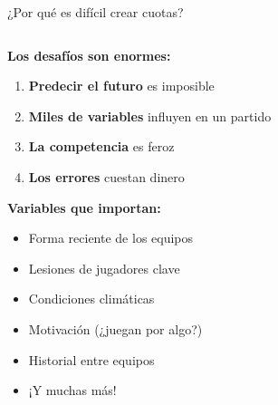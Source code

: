 \documentclass[aspectratio=169]{beamer}
\begin{document}
\begin{frame}{¿Por qué es difícil crear cuotas?}
\begin{columns}
\begin{column}{0.6\textwidth}
\textbf{Los desafíos son enormes:}
\begin{enumerate}
\item \textcolor{rojocomplementario}{\textbf{Predecir el futuro}} es imposible
\item \textcolor{azulprincipai}{\textbf{Miles de variables}} influyen en un partido
\item \textcolor{verdepositivo}{\textbf{La competencia}} es feroz
\item \textcolor{rojocomplementario}{\textbf{Los errores}} cuestan dinero
\end{enumerate}

\vspace{0.5cm}
\textbf{Variables que importan:}
\begin{itemize}
\item Forma reciente de los equipos
\item Lesiones de jugadores clave
\item Condiciones climáticas
\item Motivación (¿juegan por algo?)
\item Historial entre equipos
\item ¡Y muchas más!
\end{itemize}
\end{column}
\begin{column}{0.4\textwidth}
\end{column}
\end{columns}
\end{frame}
\end{document}
